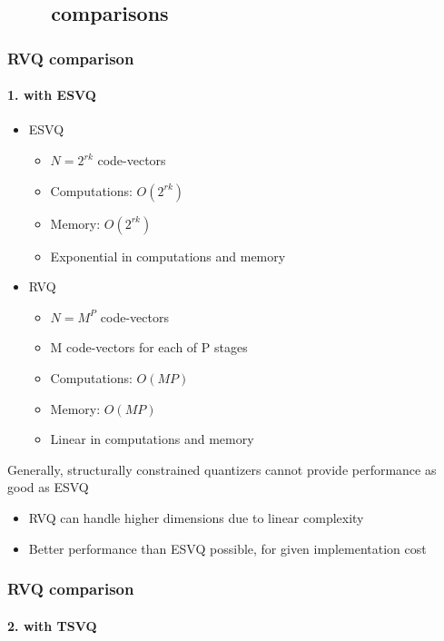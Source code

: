 \subsection{\ \ \ \ comparisons}
\begin{frame}
\frametitle{RVQ comparison}\logoCSIPCPL\mypagenum
\framesubtitle{1. with ESVQ}
	\begin{itemize}
		\item ESVQ
			\begin{itemize}
				\item $N=2^{rk}$ code-vectors
				\item Computations: $O(2^{rk})$
				\item Memory: $O(2^{rk})$
				\item Exponential in computations and memory
			\end{itemize}
		\item RVQ
			\begin{itemize}
				\item $N={M^P}$ code-vectors
				\item M code-vectors for each of P stages
				\item Computations: $O(MP)$
				\item Memory: $O(MP)$
				\item Linear in computations and memory
			\end{itemize}
	\end{itemize}
	Generally, structurally constrained quantizers cannot provide performance as good as ESVQ
	\begin{itemize}
		\item RVQ can handle higher dimensions due to linear complexity
		\item Better performance than ESVQ possible, for given implementation cost
	\end{itemize}	
\end{frame}


\begin{frame}[plain]
\frametitle{RVQ comparison}
\framesubtitle{2. with TSVQ}
\logoCSIPCPL\mypagenum
\end{frame}



